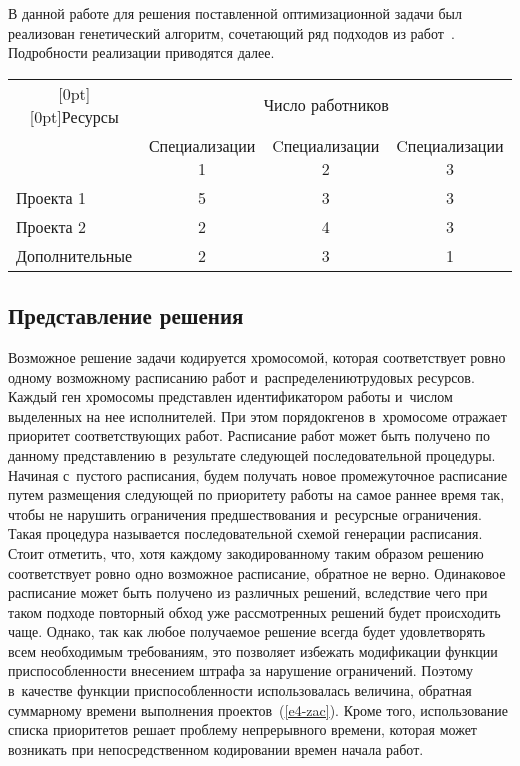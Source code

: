 \begin{multicols}{2}
  В данной работе для решения поставленной оптимизационной задачи был 
реализован генетический алгоритм, сочетающий ряд подходов из  
работ~\cite{12-zac, 13-zac, 14-zac}. Подробности реализации приводятся далее.

 \begin{table*}[b]\small %
 \vspace*{-14pt}
  \begin{center}
  \vspace*{2ex}
  
  \begin{tabular}{|l|c|c|c|}
  \hline %
\multicolumn{1}{|c|}{\raisebox{-6pt}[0pt][0pt]{Ресурсы}}&
\multicolumn{3}{c|}{Число работников}\\
\cline{2-4}
&Специализации 1&Cпециализации 2&Cпециализации 3\\
\hline
Проекта 1&5&3&3\\
Проекта 2&2&4&3\\
Дополнительные&2&3&1\\
\hline
\end{tabular}
\end{center}
\end{table*}
  
  \subsection{Представление решения}
  
Возможное решение задачи кодируется хромосомой, которая соответствует 
ровно одному возможному расписанию работ и~распределению\linebreak трудовых 
ресурсов. Каждый ген хромосомы пред\-став\-лен идентификатором работы 
и~числом выделенных на нее исполнителей. При этом порядок\linebreak генов 
в~хромосоме отражает приоритет соответствующих работ. Расписание работ 
может быть получено по данному представлению в~результате следующей 
последовательной процедуры. Начиная с~пустого расписания, будем получать 
новое промежуточное расписание путем размещения следующей по приоритету 
работы на самое раннее время так, чтобы не нарушить ограничения 
предшествования и~ресурсные ограничения. Такая процедура называется 
последовательной схемой генерации расписания. Стоит отметить, что, хотя 
каждому закодированному таким образом решению соответствует ровно одно 
возможное расписание, обратное не верно. Одинаковое расписание может быть 
получено из различных решений, вследствие чего при таком подходе 
повторный обход уже рассмотренных решений будет происходить чаще. 
Однако, так как любое получаемое решение всегда будет удовлетворять всем 
необходимым требованиям, это позволяет избежать модификации функции 
приспособленности внесением штрафа за нарушение ограничений. Поэтому 
в~качестве функции приспособленности использовалась величина, обратная 
суммарному времени выполнения проектов~(\ref{e4-zac}). Кроме того, 
использование списка приоритетов решает проблему непрерывного времени, 
которая может возникать при непосредственном кодировании времен начала 
работ.


\end{multicols}
